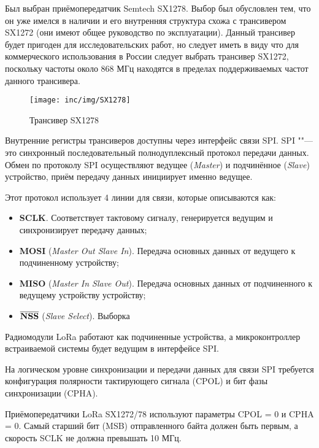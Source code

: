 Был выбран приёмопередатчик Semtech SX1278. Выбор был обусловлен тем, что он 
уже имелся в наличии и его внутренняя структура схожа с трансивером SX1272 (они 
имеют общее руководство по эксплуатации).
Данный трансивер будет пригоден для исследовательских работ, но следует иметь в 
виду что для коммерческого использования в России следует выбрать трансивер 
SX1272, поскольку частоты около 868 МГц находятся в пределах поддерживаемых 
частот данного трансивера.

\begin{figure}[!h]
  \centering
  \texttt{[image: inc/img/SX1278]}
  \caption{Трансивер SX1278}
  \label{fig:sx1278}
\end{figure}

Внутренние регистры трансиверов доступны через интерфейс связи SPI.
SPI ""--- это синхронный последовательный полнодуплексный протокол передачи 
данных. 
Обмен по протоколу SPI осуществляют ведущее (\textit{Master}) и подчинённое 
(\textit{Slave}) устройство, приём передачу данных инициирует именно ведущее.

Этот протокол использует 4 линии для связи, которые описываются как:
\begin{itemize}
 \item \textbf{SCLK}. Соответствует тактовому сигналу, генерируется ведущим и 
синхронизирует передачу данных;
 \item \textbf{MOSI} (\textit{Master Out Slave In}). Передача основных данных 
от ведущего к подчиненному устройству;
 \item \textbf{MISO} (\textit{Master In Slave Out}). Передача основных данных 
от подчиненного к ведущему устройству устройству;
 \item $\overline{\text{\textbf{NSS}}}$ (\textit{Slave Select}). Выборка 
\end{itemize}

Радиомодули LoRa работают как подчиненные устройства, а микроконтроллер 
встраиваемой системы будет ведущим в интерфейсе SPI.

На логическом уровне синхронизации и передачи данных для связи SPI требуется 
конфигурация полярности тактирующего сигнала (CPOL) и бит фазы синхронизации 
(CPHA).

Приёмопередатчики LoRa SX1272/78 используют параметры CPOL = 0 и CPHA = 0.
Самый старший бит (MSB) отправленного байта должен быть первым, а скорость SCLK 
не должна превышать 10 МГц.

